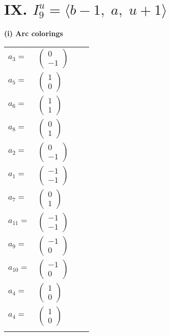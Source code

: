 \documentclass[1p]{elsarticle_modified}
\theoremstyle{definition}
\begin{document}
\centering \section*{IX. $I^u_{9}= \langle b-1,\;a,\;u+1 \rangle$}
\flushleft \textbf{(i) Arc colorings}\\
\begin{tabular}{m{7pt} m{180pt} m{7pt} m{180pt} }
\flushright $a_{3}=$&$\begin{pmatrix}0\\-1\end{pmatrix}$ \\
\flushright $a_{5}=$&$\begin{pmatrix}1\\0\end{pmatrix}$ \\
\flushright $a_{6}=$&$\begin{pmatrix}1\\1\end{pmatrix}$ \\
\flushright $a_{8}=$&$\begin{pmatrix}0\\1\end{pmatrix}$ \\
\flushright $a_{2}=$&$\begin{pmatrix}0\\-1\end{pmatrix}$ \\
\flushright $a_{1}=$&$\begin{pmatrix}-1\\-1\end{pmatrix}$ \\
\flushright $a_{7}=$&$\begin{pmatrix}0\\1\end{pmatrix}$ \\
\flushright $a_{11}=$&$\begin{pmatrix}-1\\-1\end{pmatrix}$ \\
\flushright $a_{9}=$&$\begin{pmatrix}-1\\0\end{pmatrix}$ \\
\flushright $a_{10}=$&$\begin{pmatrix}-1\\0\end{pmatrix}$ \\
\flushright $a_{4}=$&$\begin{pmatrix}1\\0\end{pmatrix}$\\ \flushright $a_{4}=$&$\begin{pmatrix}1\\0\end{pmatrix}$\\&\end{tabular}
\end{document}
